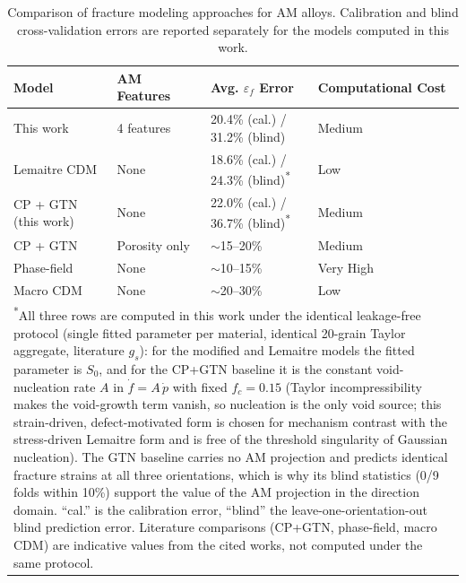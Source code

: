 \documentclass[twocolumn]{sagej}
\begin{document}
\begin{table}[htbp]
\centering
\caption{Comparison of fracture modeling approaches for AM alloys. Calibration and blind cross-validation errors are reported separately for the models computed in this work.}
\label{tab:model_comparison}
\footnotesize
\setlength{\tabcolsep}{5pt}
\begin{tabular}{p{2.9cm}p{2.3cm}p{3.7cm}p{2.6cm}}
\toprule
\textbf{Model} & \textbf{AM Features} & \textbf{Avg. $\varepsilon_f$ Error} & \textbf{Computational Cost} \\
\midrule
This work       & 4 features     & 20.4\% (cal.) / 31.2\% (blind)  & Medium \\
Lemaitre CDM    & None           & 18.6\% (cal.) / 24.3\% (blind)\textsuperscript{*} & Low \\
CP + GTN (this work) & None        & 22.0\% (cal.) / 36.7\% (blind)\textsuperscript{*} & Medium \\
CP + GTN \cite{zhang2021modeling}  & Porosity only  & $\sim$15--20\% & Medium \\
Phase-field \cite{liu2022phase}    & None           & $\sim$10--15\% & Very High \\
Macro CDM \cite{chen2022damage}    & None           & $\sim$20--30\% & Low \\
\bottomrule
\multicolumn{4}{p{14.5cm}}{\footnotesize \textsuperscript{*}All three rows are computed in this work under the identical leakage-free protocol (single fitted parameter per material, identical 20-grain Taylor aggregate, literature $g_s$): for the modified and Lemaitre models the fitted parameter is $S_0$, and for the CP+GTN baseline it is the constant void-nucleation rate $A$ in $\dot f = A\,\dot p$ with fixed $f_c = 0.15$ (Taylor incompressibility makes the void-growth term vanish, so nucleation is the only void source; this strain-driven, defect-motivated form is chosen for mechanism contrast with the stress-driven Lemaitre form and is free of the threshold singularity of Gaussian nucleation). The GTN baseline carries no AM projection and predicts identical fracture strains at all three orientations, which is why its blind statistics (0/9 folds within 10\%) support the value of the AM projection in the direction domain. ``cal.'' is the calibration error, ``blind'' the leave-one-orientation-out blind prediction error. Literature comparisons (CP+GTN, phase-field, macro CDM) are indicative values from the cited works, not computed under the same protocol.}
\end{tabular}
\end{table}
\end{document}
